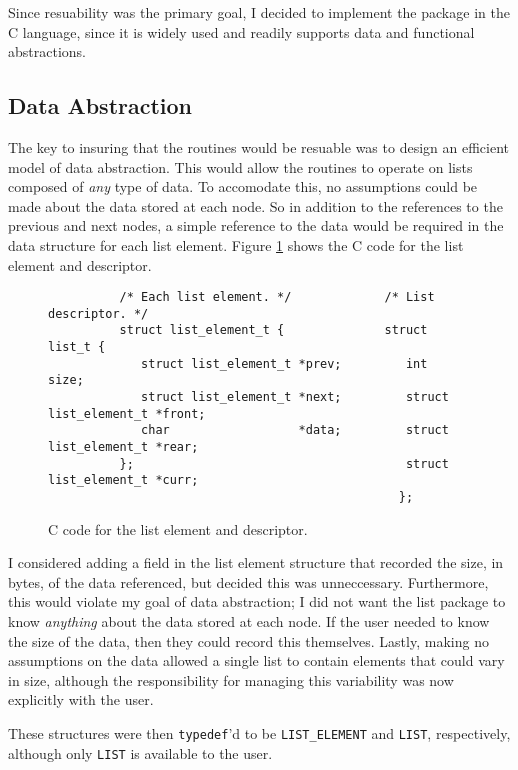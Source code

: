Since resuability was the primary goal, I decided to implement the package in
the C language, since it is widely used and readily supports data and
functional abstractions.

\subsection{Data Abstraction}
The key to insuring that the routines would be resuable was to design an
efficient model of data abstraction.  This would allow the routines to operate
on lists composed of {\em any} type of data.  To accomodate this, no
assumptions could be made about the data stored at each node.  So in addition
to the references to the previous and next nodes, a simple reference to the
data would be required in the data structure for each list element.  Figure
\ref{ds} shows the C code for the list element and descriptor.

\begin{figure}[t]
\begin{verbatim}
          /* Each list element. */             /* List descriptor. */          
          struct list_element_t {              struct list_t {
             struct list_element_t *prev;         int                   size;
             struct list_element_t *next;         struct list_element_t *front;
             char                  *data;         struct list_element_t *rear;
          };                                      struct list_element_t *curr;
                                                 };
\end{verbatim}
\caption{C code for the list element and descriptor.}
\label{ds}
\end{figure}

I considered adding a field in the list element structure that recorded the
size, in bytes, of the data referenced, but decided this was unneccessary.
Furthermore, this would violate my goal of data abstraction; I did not want
the list package to know {\em anything} about the data stored at each node.
If the user needed to know the size of the data, then they could record this
themselves.  Lastly, making no assumptions on the data allowed a single list
to contain elements that could vary in size, although the responsibility for
managing this variability was now explicitly with the user.

These structures were then {\tt typedef}'d to be {\tt LIST\_ELEMENT} and
{\tt LIST}, respectively, although only {\tt LIST} is available to the user.

